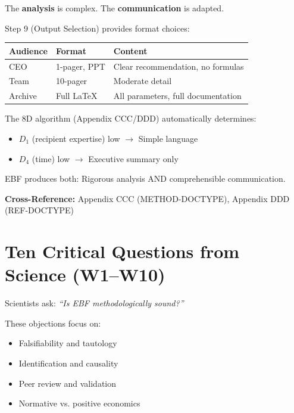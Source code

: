 \begin{axiom}
The \textbf{analysis} is complex. The \textbf{communication} is adapted.

Step 9 (Output Selection) provides format choices:
\begin{center}
\begin{tabular}{lll}
\textbf{Audience} & \textbf{Format} & \textbf{Content} \\
\midrule
CEO & 1-pager, PPT & Clear recommendation, no formulas \\
Team & 10-pager & Moderate detail \\
Archive & Full LaTeX & All parameters, full documentation \\
\end{tabular}
\end{center}

The 8D algorithm (Appendix CCC/DDD) automatically determines:
\begin{itemize}[nosep]
    \item $D_1$ (recipient expertise) low $\rightarrow$ Simple language
    \item $D_4$ (time) low $\rightarrow$ Executive summary only
\end{itemize}

EBF produces both: Rigorous analysis AND comprehensible communication.
\end{axiom}

\textbf{Cross-Reference:} Appendix CCC (METHOD-DOCTYPE), Appendix DDD (REF-DOCTYPE)

\section{Ten Critical Questions from Science (W1--W10)}
\label{sec:da-science}

\begin{tcolorbox}[colback=green!5!white, colframe=green!75!black,
    title=Scientific Objections: The Validity Challenge]

Scientists ask: \textit{``Is EBF methodologically sound?''}

These objections focus on:
\begin{itemize}[nosep]
    \item Falsifiability and tautology
    \item Identification and causality
    \item Peer review and validation
    \item Normative vs. positive economics
\end{itemize}

\end{tcolorbox}

